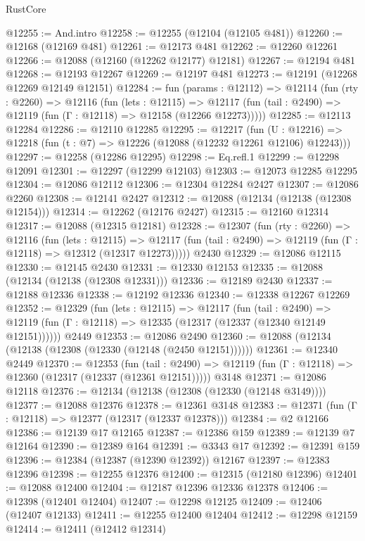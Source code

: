 \begin{lexlean}{RustCore}
\begin{coremodule}
@12255 := And.intro
@12258 := @12255 (@12104 (@12105 @481))
@12260 := @12168 (@12169 @481)
@12261 := @12173 @481
@12262 := @12260 @12261
@12266 := @12088 (@12160 (@12262 @12177) @12181)
@12267 := @12194 @481
@12268 := @12193 @12267
@12269 := @12197 @481
@12273 := @12191 (@12268 @12269 @12149 @12151)
@12284 := fun (params : @12112) =>
  @12114
    (fun (rty : @2260) =>
    @12116
      (fun (lets : @12115) =>
      @12117 (fun (tail : @2490) => @12119 (fun (Γ : @12118) => @12158 (@12266 @12273)))))
@12285 := @12113 @12284
@12286 := @12110 @12285
@12295 := @12217
    (fun (U : @12216) => @12218 (fun (t : @7) => @12226 (@12088 (@12232 @12261 @12106) @12243)))
@12297 := @12258 (@12286 @12295)
@12298 := Eq.refl.{1}
@12299 := @12298 @12091
@12301 := @12297 (@12299 @12103)
@12303 := @12073 @12285 @12295
@12304 := @12086 @12112
@12306 := @12304 @12284 @2427
@12307 := @12086 @2260
@12308 := @12141 @2427
@12312 := @12088 (@12134 (@12138 (@12308 @12154)))
@12314 := @12262 (@12176 @2427)
@12315 := @12160 @12314
@12317 := @12088 (@12315 @12181)
@12328 := @12307
    (fun (rty : @2260) =>
    @12116
      (fun (lets : @12115) =>
      @12117 (fun (tail : @2490) => @12119 (fun (Γ : @12118) => @12312 (@12317 @12273)))))
    @2430
@12329 := @12086 @12115
@12330 := @12145 @2430
@12331 := @12330 @12153
@12335 := @12088 (@12134 (@12138 (@12308 @12331)))
@12336 := @12189 @2430
@12337 := @12188 @12336
@12338 := @12192 @12336
@12340 := @12338 @12267 @12269
@12352 := @12329
    (fun (lets : @12115) =>
    @12117
      (fun (tail : @2490) =>
      @12119 (fun (Γ : @12118) => @12335 (@12317 (@12337 (@12340 @12149 @12151))))))
    @2449
@12353 := @12086 @2490
@12360 := @12088 (@12134 (@12138 (@12308 (@12330 (@12148 (@2450 @12151))))))
@12361 := @12340 @2449
@12370 := @12353
    (fun (tail : @2490) => @12119 (fun (Γ : @12118) => @12360 (@12317 (@12337 (@12361 @12151)))))
    @3148
@12371 := @12086 @12118
@12376 := @12134 (@12138 (@12308 (@12330 (@12148 @3149))))
@12377 := @12088 @12376
@12378 := @12361 @3148
@12383 := @12371 (fun (Γ : @12118) => @12377 (@12317 (@12337 @12378)))
@12384 := @2 @12166
@12386 := @12139 @17 @12165
@12387 := @12386 @159
@12389 := @12139 @7 @12164
@12390 := @12389 @164
@12391 := @3343 @17
@12392 := @12391 @159
@12396 := @12384 (@12387 (@12390 @12392)) @12167
@12397 := @12383 @12396
@12398 := @12255 @12376
@12400 := @12315 (@12180 @12396)
@12401 := @12088 @12400
@12404 := @12187 @12396 @12336 @12378
@12406 := @12398 (@12401 @12404)
@12407 := @12298 @12125
@12409 := @12406 (@12407 @12133)
@12411 := @12255 @12400 @12404
@12412 := @12298 @12159
@12414 := @12411 (@12412 @12314)

\end{coremodule}
\end{lexlean}
